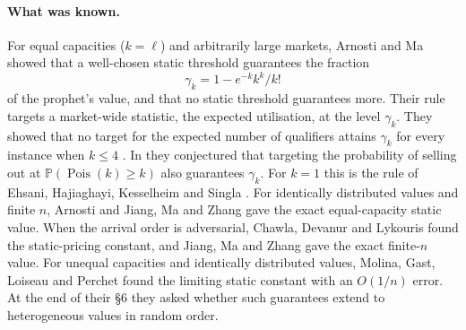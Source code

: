 \documentclass[11pt,a4paper]{article}
\theoremstyle{remark}
\newcommand{\Prob}{\mathbb P}
\newcommand{\Pois}{\operatorname{Pois}}
\begin{document}
\paragraph{What was known.}
For equal capacities ($k=\ell$) and arbitrarily large markets, Arnosti and Ma \cite{am} showed that a well-chosen static threshold guarantees the fraction
\[
 \gamma_k=1-e^{-k}k^k/k!
\]
of the prophet's value, and that no static threshold guarantees more. Their rule targets a market-wide statistic, the expected utilisation, at the level $\gamma_k$. They showed that no target for the expected number of qualifiers attains $\gamma_k$ for every instance when $k\le4$ \cite[Proposition~1]{am}. In \cite[\S5.2]{am} they conjectured that targeting the probability of selling out at $\Prob(\Pois(k)\ge k)$ also guarantees $\gamma_k$. For $k=1$ this is the rule of Ehsani, Hajiaghayi, Kesselheim and Singla \cite{ehks}. For identically distributed values and finite $n$, Arnosti \cite{blog} and Jiang, Ma and Zhang \cite[Theorem~8 and Corollary~2]{jmz} gave the exact equal-capacity static value. When the arrival order is adversarial, Chawla, Devanur and Lykouris \cite{cdl} found the static-pricing constant, and Jiang, Ma and Zhang \cite[Theorem~6 and equation~(21)]{jmz} gave the exact finite-$n$ value. For unequal capacities and identically distributed values, Molina, Gast, Loiseau and Perchet \cite[Theorem~1.4]{mg} found the limiting static constant with an $O(1/n)$ error. At the end of their \S6 they asked whether such guarantees extend to heterogeneous values in random order.
\end{document}
